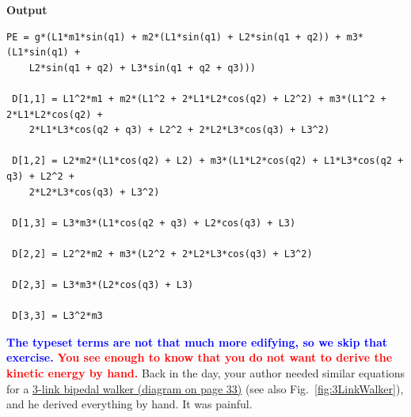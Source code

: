 \textbf{Output} 
\begin{verbatim}
PE = g*(L1*m1*sin(q1) + m2*(L1*sin(q1) + L2*sin(q1 + q2)) + m3*(L1*sin(q1) + 
    L2*sin(q1 + q2) + L3*sin(q1 + q2 + q3)))

 D[1,1] = L1^2*m1 + m2*(L1^2 + 2*L1*L2*cos(q2) + L2^2) + m3*(L1^2 + 2*L1*L2*cos(q2) + 
    2*L1*L3*cos(q2 + q3) + L2^2 + 2*L2*L3*cos(q3) + L3^2)

 D[1,2] = L2*m2*(L1*cos(q2) + L2) + m3*(L1*L2*cos(q2) + L1*L3*cos(q2 + q3) + L2^2 + 
    2*L2*L3*cos(q3) + L3^2)

 D[1,3] = L3*m3*(L1*cos(q2 + q3) + L2*cos(q3) + L3)

 D[2,2] = L2^2*m2 + m3*(L2^2 + 2*L2*L3*cos(q3) + L3^2)

 D[2,3] = L3*m3*(L2*cos(q3) + L3)

 D[3,3] = L3^2*m3
\end{verbatim}
\textcolor{blue}{\bf The typeset terms are not that much more edifying, so we skip that exercise.} \textcolor{red}{\bf You see enough to know that you do not want to derive the kinetic energy by hand.} Back in the day, your author needed similar equations for a \href{https://grizzle.robotics.umich.edu/files/biped.pdf}{3-link bipedal walker (diagram on page 33)} (see also Fig.~\ref{fig:3LinkWalker}), and he derived everything by hand. It was painful.


 
 
 
 
